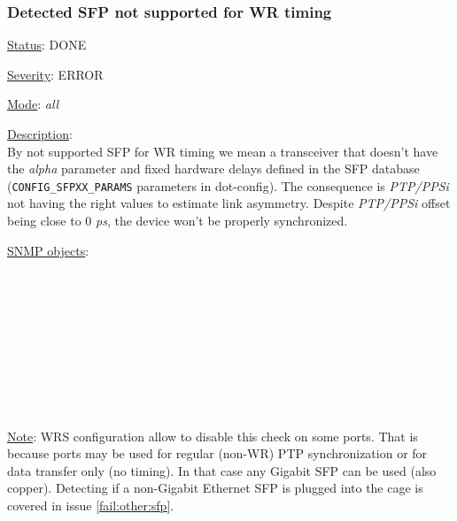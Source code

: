 \subsubsection{\bf Detected SFP not supported for WR timing}
		\label{fail:timing:wrong_sfp}
		\begin{pck_descr}
			\item [] \underline{Status}: DONE
			\item [] \underline{Severity}: ERROR
			\item [] \underline{Mode}: \emph{all}
			\item [] \underline{Description}:\\
				By not supported SFP for WR timing we mean a transceiver that doesn't
				have the \emph{alpha} parameter and fixed hardware delays defined in the
				SFP database (\texttt{CONFIG\_SFPXX\_PARAMS} parameters in dot-config). The consequence is
				\emph{PTP/PPSi} not having the right values to estimate link asymmetry.
				Despite \emph{PTP/PPSi} offset being close to 0 \emph{ps}, the device won't
				be properly synchronized.
			\item [] \underline{SNMP objects}:\\
        {\footnotesize
				\\
				\\
				\\
				\\
				\\
				\\
				\\
				\\
				\\
         }
			\item [] \underline{Note}: WRS configuration allow to disable this check on some ports.
				That is because ports may be used for regular (non-WR) PTP
				synchronization or for data transfer only (no timing). In that case any
				Gigabit SFP can be used (also copper). Detecting if a non-Gigabit
				Ethernet SFP is plugged into the cage is covered in issue
        \ref{fail:other:sfp}.
		\end{pck_descr}

